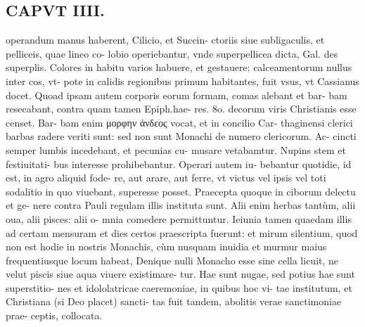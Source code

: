 \documentclass{article}
\begin{document}
\begin{pages}
\section*{CAPVT  IIII. }
\marginpar{[ p.221 ]}\pstart operandum manus haberent, Cilicio, et Succin- ctoriis siue subligaculis, et pelliceis, quae lineo co- lobio operiebantur, vnde superpellicea dicta, Gal. des superplis. Colores in habitu varios habuere, et gestauere: calceamentorum nullus inter cos, vt- pote in calidis regionibus primum habitantes, fuit vsus, vt Cassianus docet. Quoad ipsam autem corporis eorum formam, comas alebant et bar- bam resecabant, contra quam tamen Epiph.hae- res. 8o. decorum viris Christianis esse censet. Bar- bam enim μορφην ἀνδεος vocat, et in concilio Car- thaginensi clerici barbas radere veriti sunt: sed non sunt Monachi de numero clericorum. Ac- cincti semper lumbis incedebant, et pecunias cu- musare vetabamtur. Nupins stem et festiuitati- bus interesse prohibebantur. Operari autem iu- bebantur quotidie, id est, in agro aliquid fode- re, aut arare, aut ferre, vt victus vel ipsis vel toti sodalitio in quo viuebant, superesse posset.  \pend\pstart Praecepta quoque in ciborum delectu et ge- nere contra Pauli regulam illis instituta sunt. Alii enim herbas tantùm, alii oua, alii pisces: alii o- mnia comedere permittuntur. Ieiunia tamen quaedam illis ad certam mensuram et dies certos praescripta fuerunt: et mirum silentium, quod non est hodie in nostris Monachis, cùm nusquam inuidia et murmur maius frequentiusque locum habeat, Denique nulli Monacho esse sine cella licuit, ne velut piscis siue aqua viuere existimare- tur. Hae sunt nugae, sed potius hae sunt superstitio- nes et idololatricae caeremoniae, in quibus hoc vi- tae institutum, et Christiana (si Deo placet) sancti- tas fuit tandem, abolitis verae sanctimoniae prae- ceptis, collocata.  \pend

\end{pages}
\end{document}
